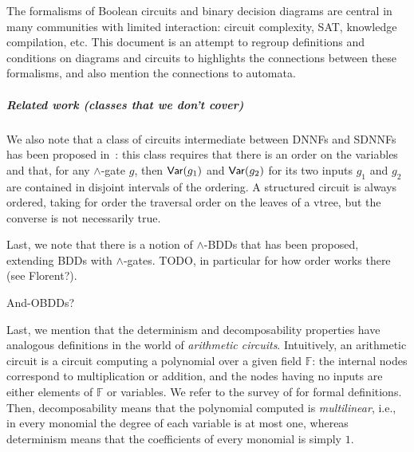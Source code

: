 The formalisms of Boolean circuits and binary decision diagrams are central in many
communities with limited interaction: circuit complexity, SAT, knowledge
compilation, etc. This document is an attempt to regroup definitions and
conditions on diagrams and circuits to highlights the connections
between these formalisms, and also mention the connections to automata.







\subparagraph*{Related work (classes that we don't cover)}
We also note that a class of circuits intermediate between DNNFs and SDNNFs has been proposed in~\cite{amarilli2017circuit}: this class requires that there is an order on the variables and that, for any $\land$-gate $g$, then $\mathsf{Var}(g_1)$ and $\mathsf{Var}(g_2)$ for its two inputs $g_1$ and $g_2$ are contained in disjoint intervals of the ordering. A structured circuit is always ordered, taking for order the traversal order on the leaves of a vtree, but the converse is not necessarily true.

Last, we note that there is a notion of $\land$-BDDs that has been proposed, extending BDDs with $\land$-gates. TODO, in particular for how order works there (see Florent?).

And-OBDDs?

Last, we mention that the determinism and decomposability properties have
analogous definitions in the world of \emph{arithmetic circuits}. Intuitively,
an arithmetic circuit is a circuit computing a polynomial over a given field
$\mathbb{F}$: the internal nodes correspond to multiplication or addition, and
the nodes having no inputs are either elements of $\mathbb{F}$ or variables. We
refer to the survey of \cite{shpilka2010arithmetic} for formal definitions. Then,
decomposability means that the polynomial computed is \emph{multilinear}, i.e.,
in every monomial the degree of each variable is at most one, whereas
determinism means that the coefficients of every monomial is simply $1$.

